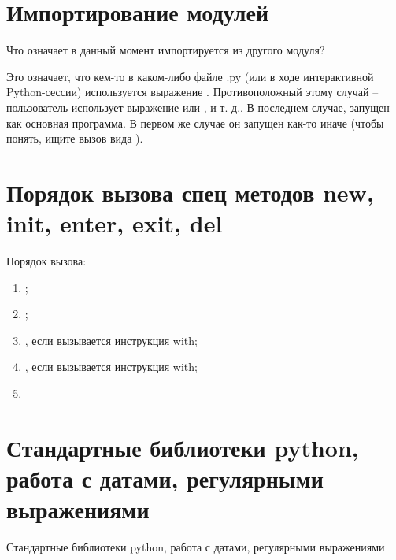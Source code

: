 \section{Импортирование модулей}
Что означает  в данный момент импортируется из другого модуля?

Это означает, что кем-то в каком-либо файле .py (или в ходе интерактивной Python-сессии) используется выражение . Противоположный этому случай – пользователь использует выражение  или , и т. д.. В последнем случае,  запущен как основная программа. В первом же случае он запущен как-то иначе (чтобы понять, ищите вызов вида ).

\section{Порядок вызова спец методов new, init, enter, exit, del}

Порядок вызова:

\begin{enumerate}
\item {};
\item {};
\item {}, если вызывается инструкция with;
\item {}, если вызывается инструкция with;
\item {}
\end{enumerate}

\section{Стандартные библиотеки python, работа с датами, регулярными выражениями}

Стандартные библиотеки python, работа с датами, регулярными выражениями

